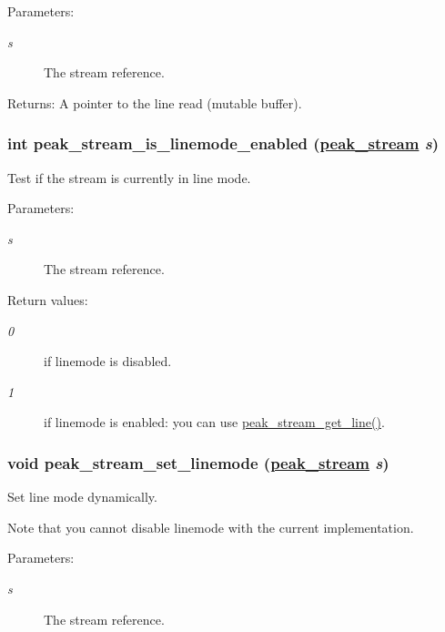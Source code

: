 \begin{Desc}
\item[Parameters:]
\begin{description}
\item[{\em s}]The stream reference.\end{description}
\end{Desc}
\begin{Desc}
\item[Returns:]A pointer to the line read (mutable buffer). \end{Desc}
\hypertarget{group__stream__line_ga0}{
\subsubsection[peak\_\-stream\_\-is\_\-linemode\_\-enabled]{\setlength{\rightskip}{0pt plus 5cm}int peak\_\-stream\_\-is\_\-linemode\_\-enabled (\hyperlink{group__stream_ga0}{peak\_\-stream} {\em s})}}
\label{group__stream__line_ga0}


Test if the stream is currently in line mode. 

\begin{Desc}
\item[Parameters:]
\begin{description}
\item[{\em s}]The stream reference.\end{description}
\end{Desc}
\begin{Desc}
\item[Return values:]
\begin{description}
\item[{\em 0}]if linemode is disabled. \item[{\em 1}]if linemode is enabled: you can use \hyperlink{group__stream__line_ga44}{peak\_\-stream\_\-get\_\-line()}. \end{description}
\end{Desc}
\hypertarget{group__stream__line_ga1}{
\subsubsection[peak\_\-stream\_\-set\_\-linemode]{\setlength{\rightskip}{0pt plus 5cm}void peak\_\-stream\_\-set\_\-linemode (\hyperlink{group__stream_ga0}{peak\_\-stream} {\em s})}}
\label{group__stream__line_ga1}


Set line mode dynamically. 

Note that you cannot disable linemode with the current implementation.

\begin{Desc}
\item[Parameters:]
\begin{description}
\item[{\em s}]The stream reference. \end{description}
\end{Desc}
